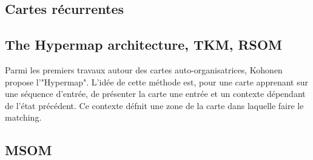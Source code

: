 \subsection{Cartes récurrentes }



\subsection{The Hypermap architecture, TKM, RSOM}
Parmi les premiers travaux autour des cartes auto-organisatrices, Kohonen propose l'"Hypermap". L'idée de cette méthode est, pour une carte apprenant sur une séquence d'entrée, de présenter la carte une entrée et un contexte dépendant de l'état précédent. Ce contexte défnit une zone de la carte dans laquelle faire le matching.

\subsection{MSOM}
